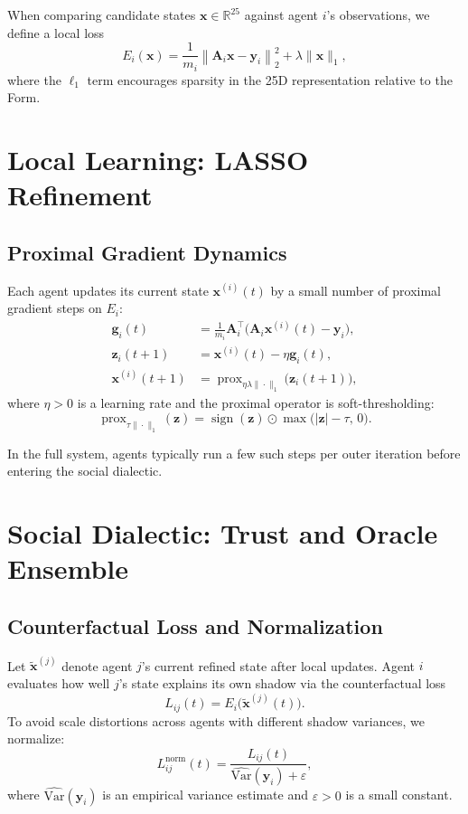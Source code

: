 \documentclass[11pt]{article}
\begin{document}
When comparing candidate states $\bm{x} \in \mathbb{R}^{25}$ against
agent $i$'s observations, we define a local loss
\[
  E_i(\bm{x}) = \frac{1}{m_i} \left\| \bm{A}_i \bm{x} - \bm{y}_i \right\|_2^2
               + \lambda \| \bm{x} \|_1,
\]
where the $\ell_1$ term encourages sparsity in the 25D representation
relative to the Form.

\section{Local Learning: LASSO Refinement}

\subsection{Proximal Gradient Dynamics}

Each agent updates its current state $\bm{x}^{(i)}(t)$ by a small number
of proximal gradient steps on $E_i$:
\begin{align*}
  \bm{g}_i(t) &= \frac{1}{m_i} \bm{A}_i^\top
                \bigl( \bm{A}_i \bm{x}^{(i)}(t) - \bm{y}_i \bigr), \\
  \bm{z}_i(t+1) &= \bm{x}^{(i)}(t) - \eta \bm{g}_i(t), \\
  \bm{x}^{(i)}(t+1) &= \operatorname{prox}_{\eta \lambda \|\cdot\|_1}
                      \bigl( \bm{z}_i(t+1) \bigr),
\end{align*}
where $\eta > 0$ is a learning rate and the proximal operator is
soft-thresholding:
\[
  \operatorname{prox}_{\tau \|\cdot\|_1}(\bm{z})
  = \operatorname{sign}(\bm{z}) \odot
    \max\bigl( |\bm{z}| - \tau, \, 0 \bigr).
\]

In the full system, agents typically run a few such steps per outer
iteration before entering the social dialectic.

\section{Social Dialectic: Trust and Oracle Ensemble}

\subsection{Counterfactual Loss and Normalization}

Let $\tilde{\bm{x}}^{(j)}$ denote agent $j$'s current refined state
after local updates.
Agent $i$ evaluates how well $j$'s state explains its own shadow via
the counterfactual loss
\[
  L_{ij}(t) = E_i\bigl( \tilde{\bm{x}}^{(j)}(t) \bigr).
\]
To avoid scale distortions across agents with different shadow
variances, we normalize:
\[
  L_{ij}^{\text{norm}}(t) =
  \frac{L_{ij}(t)}{\widehat{\mathrm{Var}}(\bm{y}_i) + \varepsilon},
\]
where $\widehat{\mathrm{Var}}(\bm{y}_i)$ is an empirical variance estimate
and $\varepsilon > 0$ is a small constant.
\end{document}
